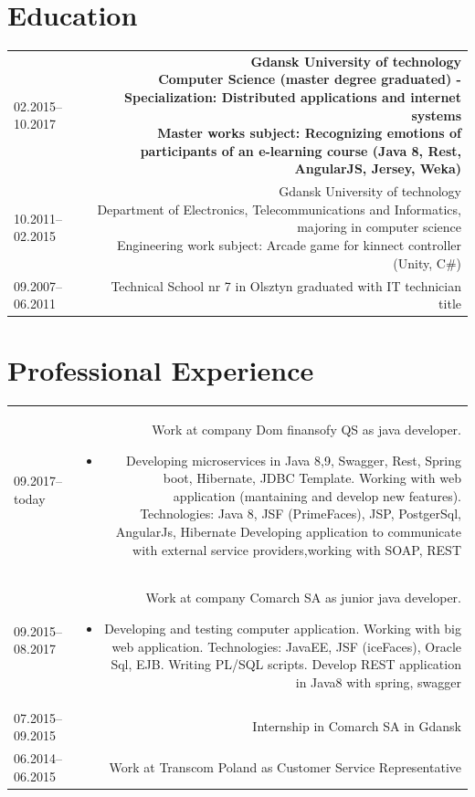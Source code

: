 \documentclass[1pt]{my_cv}
\begin{document}
	\section*{Education}
	\begin{tabular}{L!{\VRule}R}
		02.2015--10.2017&{\bf Gdansk University of technology \newline Computer Science (master degree graduated) - Specialization: Distributed applications and internet systems\newline
		\bf	Master works subject: Recognizing emotions of participants of an e-learning course (Java 8, Rest, AngularJS, Jersey, Weka)}\\[5pt]
		10.2011--02.2015&{Gdansk University of technology\newline 
			Department of  Electronics, Telecommunications and Informatics, majoring in computer science\newline
			Engineering work subject: Arcade game for kinnect controller (Unity, C\#)}\\
		09.2007--06.2011&{Technical School nr 7 in Olsztyn graduated with IT technician title}\\
	\end{tabular}
	\section*{Professional Experience}
	\begin{tabular}{L!{\VRule}R}
		09.2017--today&{Work at company Dom finansofy QS as java developer.}
			\begin{itemize}  
				\item{Developing microservices in Java 8,9, Swagger, Rest, Spring boot, Hibernate, JDBC Template.}
				{Working with web application (mantaining and develop new features). Technologies: Java 8, JSF (PrimeFaces), JSP, PostgerSql, AngularJs, Hibernate }
				{Developing application to communicate with external service providers,working with SOAP, REST}	
			\end{itemize}\\
		09.2015--08.2017&{Work at company Comarch SA as junior java developer.}
		\begin{itemize}  
			\item{Developing and testing computer application.}
			{Working with big web application. Technologies: JavaEE, JSF (iceFaces), Oracle Sql, EJB.}
			{Writing PL/SQL scripts.}			
			{Develop REST application in Java8 with spring, swagger}
		\end{itemize}\\
		07.2015--09.2015&{Internship in Comarch SA in Gdansk}\\
		06.2014--06.2015&{Work at Transcom Poland as Customer Service Representative} 
	\end{tabular}
\end{document}
